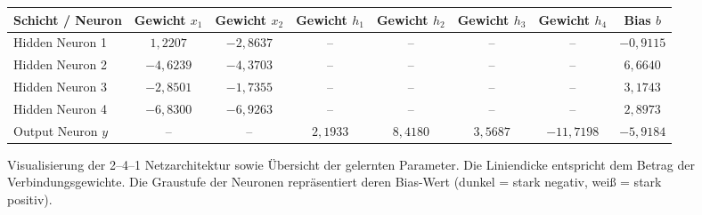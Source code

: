 \begin{figure}[htbp]
	\small
	\small
	\begin{tabular}{l c c c c c c c}
		\toprule
		\textbf{Schicht / Neuron} & \textbf{Gewicht $x_1$} & \textbf{Gewicht $x_2$} & \textbf{Gewicht $h_1$} & \textbf{Gewicht $h_2$} & \textbf{Gewicht $h_3$} & \textbf{Gewicht $h_4$} & \textbf{Bias $b$} \\
		\midrule
		Hidden Neuron 1           & $1{,}2207$             & $-2{,}8637$            & --                     & --                     & --                     & --                     & $-0{,}9115$       \\
		Hidden Neuron 2           & $-4{,}6239$            & $-4{,}3703$            & --                     & --                     & --                     & --                     & $6{,}6640$        \\
		Hidden Neuron 3           & $-2{,}8501$            & $-1{,}7355$            & --                     & --                     & --                     & --                     & $3{,}1743$        \\
		Hidden Neuron 4           & $-6{,}8300$            & $-6{,}9263$            & --                     & --                     & --                     & --                     & $2{,}8973$        \\
		\midrule
		Output Neuron $y$         & --                     & --                     & $2{,}1933$             & $8{,}4180$             & $3{,}5687$             & $-11{,}7198$           & $-5{,}9184$       \\
		\bottomrule
	\end{tabular}
	\caption{Visualisierung der 2--4--1 Netzarchitektur sowie Übersicht der gelernten Parameter. Die Liniendicke entspricht dem Betrag der Verbindungsgewichte. Die Graustufe der Neuronen repräsentiert deren Bias-Wert (dunkel = stark negativ, weiß = stark positiv).}
	\label{fig:netz_architektur_gewichte}
\end{figure}

\newpage
